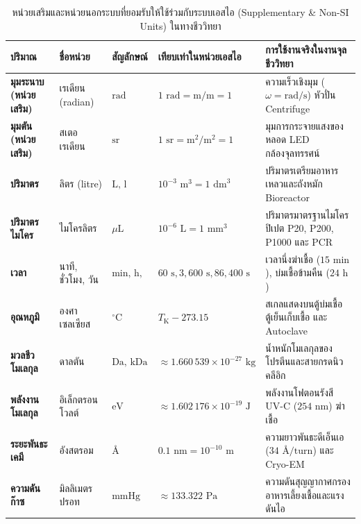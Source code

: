 \begin{table}[htbp]
\centering
\caption{หน่วยเสริมและหน่วยนอกระบบที่ยอมรับให้ใช้ร่วมกับระบบเอสไอ (Supplementary \& Non-SI Units) ในทางชีววิทยา}
\label{tab:non_si_accepted}
\footnotesize\setlength{\tabcolsep}{3.5pt}
\renewcommand{\arraystretch}{1.12}
\begin{tabularx}{\textwidth}{>{\bfseries}m{2.3cm} >{\centering\arraybackslash}m{2.2cm} >{\centering\arraybackslash}m{1.4cm} >{\centering\arraybackslash}m{2.4cm} >{\raggedright\arraybackslash}X}
\toprule
\textbf{ปริมาณ} & \textbf{ชื่อหน่วย} & \textbf{สัญลักษณ์} & \textbf{เทียบเท่าในหน่วยเอสไอ} & \textbf{การใช้งานจริงในงานจุลชีววิทยา} \\
\midrule
มุมระนาบ (หน่วยเสริม) & เรเดียน (radian) & $\text{rad}$ & $1\text{ rad} = \text{m/m} = 1$ & ความเร็วเชิงมุม ($\omega = \text{rad/s}$) หัวปั่น Centrifuge \\
มุมตัน (หน่วยเสริม) & สเตอเรเดียน & $\text{sr}$ & $1\text{ sr} = \text{m}^2/\text{m}^2 = 1$ & มุมการกระจายแสงของหลอด LED กล้องจุลทรรศน์ \\
ปริมาตร & ลิตร (litre) & $\text{L, l}$ & $10^{-3}\text{ m}^3 = 1\text{ dm}^3$ & ปริมาตรเตรียมอาหารเหลวและถังหมัก Bioreactor \\
ปริมาตรไมโคร & ไมโครลิตร & $\mu\text{L}$ & $10^{-6}\text{ L} = 1\text{ mm}^3$ & ปริมาตรมาตรฐานไมโครปิเปต P20, P200, P1000 และ PCR \\
เวลา & นาที, ชั่วโมง, วัน & $\text{min, h, d}$ & $60\text{ s}, 3{,}600\text{ s}, 86{,}400\text{ s}$ & เวลานึ่งฆ่าเชื้อ ($15\text{ min}$), บ่มเชื้อข้ามคืน ($24\text{ h}$) \\
อุณหภูมิ & องศาเซลเซียส & $^\circ\text{C}$ & $T_{\text{K}} - 273.15$ & สเกลแสดงบนตู้บ่มเชื้อ ตู้เย็นเก็บเชื้อ และ Autoclave \\
มวลชีวโมเลกุล & ดาลตัน & $\text{Da, kDa}$ & $\approx 1.660\,539 \times 10^{-27}\text{ kg}$ & น้ำหนักโมเลกุลของโปรตีนและสายกรดนิวคลีอิก \\
พลังงานโมเลกุล & อิเล็กตรอนโวลต์ & $\text{eV}$ & $\approx 1.602\,176 \times 10^{-19}\text{ J}$ & พลังงานโฟตอนรังสี UV-C ($254\text{ nm}$) ฆ่าเชื้อ \\
ระยะพันธะเคมี & อังสตรอม & \AA & $0.1\text{ nm} = 10^{-10}\text{ m}$ & ความยาวพันธะดีเอ็นเอ ($34\text{ \AA/turn}$) และ Cryo-EM \\
ความดันก๊าซ & มิลลิเมตรปรอท & $\text{mmHg}$ & $\approx 133.322\text{ Pa}$ & ความดันสุญญากาศกรองอาหารเลี้ยงเชื้อและแรงดันไอ \\
\bottomrule
\end{tabularx}
\end{table}

